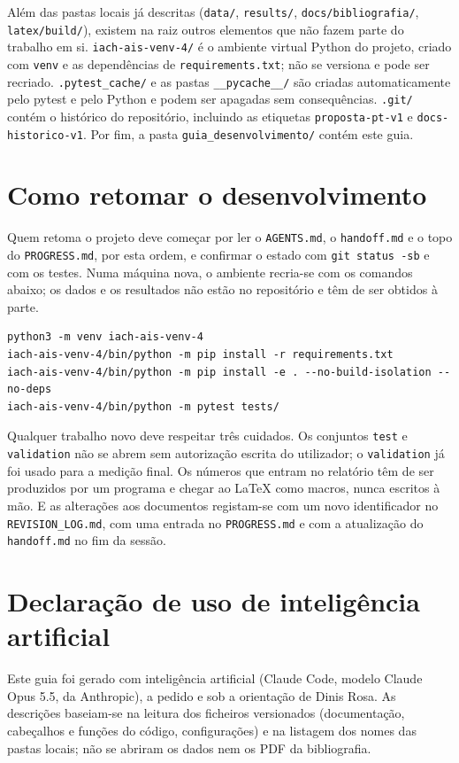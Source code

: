 \documentclass[11pt,a4paper]{article}
\newcommand{\f}[1]{\texttt{#1}}
\begin{document}
Além das pastas locais já descritas (\f{data/}, \f{results/}, \f{docs/bibliografia/},
\f{latex/build/}), existem na raiz outros elementos que não fazem parte do trabalho em si.
\f{iach-ais-venv-4/} é o ambiente virtual Python do projeto, criado com \f{venv} e as dependências
de \f{requirements.txt}; não se versiona e pode ser recriado. \f{.pytest\_cache/} e as pastas
\f{\_\_pycache\_\_/} são criadas automaticamente pelo pytest e pelo Python e podem ser apagadas sem
consequências. \f{.git/} contém o histórico do repositório, incluindo as etiquetas
\f{proposta-pt-v1} e \f{docs-historico-v1}. Por fim, a pasta \f{guia\_desenvolvimento/} contém
este guia.

\section{Como retomar o desenvolvimento}\label{sec:retomar}

Quem retoma o projeto deve começar por ler o \f{AGENTS.md}, o \f{handoff.md} e o topo do
\f{PROGRESS.md}, por esta ordem, e confirmar o estado com \f{git status -sb} e com os testes. Numa
máquina nova, o ambiente recria-se com os comandos abaixo; os dados e os resultados não estão no
repositório e têm de ser obtidos à parte.

\begin{lstlisting}
python3 -m venv iach-ais-venv-4
iach-ais-venv-4/bin/python -m pip install -r requirements.txt
iach-ais-venv-4/bin/python -m pip install -e . --no-build-isolation --no-deps
iach-ais-venv-4/bin/python -m pytest tests/
\end{lstlisting}

Qualquer trabalho novo deve respeitar três cuidados. Os conjuntos \f{test} e \f{validation} não se
abrem sem autorização escrita do utilizador; o \f{validation} já foi usado para a medição final. Os
números que entram no relatório têm de ser produzidos por um programa e chegar ao LaTeX como
macros, nunca escritos à mão. E as alterações aos documentos registam-se com um novo identificador
no \f{REVISION\_LOG.md}, com uma entrada no \f{PROGRESS.md} e com a atualização do
\f{handoff.md} no fim da sessão.

\section*{Declaração de uso de inteligência artificial}

Este guia foi gerado com inteligência artificial (Claude Code, modelo Claude Opus 5.5, da
Anthropic), a pedido e sob a orientação de Dinis Rosa. As descrições baseiam-se na leitura dos
ficheiros versionados (documentação, cabeçalhos e funções do código, configurações) e na listagem
dos nomes das pastas locais; não se abriram os dados nem os PDF da bibliografia.
\end{document}
